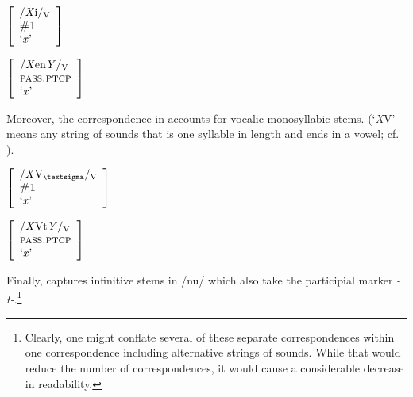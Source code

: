 \documentclass[output=paper,colorlinks,citecolor=brown,
]{langscibook}
\begin{document}
\begin{minipage}[t]{0.33\textwidth}
\ea\label{ex:rulePASS_i}
$\left[
\begin{array}{l}
    \text{/\textit{X}i/\textsubscript{V}} \\
    \textsc{\#1} \\
    \text{`\textit{x}'}
\end{array}
\right] $ 
\z
\end{minipage}%
\begin{minipage}[t]{0.45\textwidth}
\begin{exe}
\exi{$\longleftrightarrow$}
$\left[
\begin{array}{l}
    \text{/\textit{X}en\textit{Y}/\textsubscript{V}} \\
    \textsc{pass.ptcp} \\
    \text{`\textit{x}'}
\end{array}
\right] $
\end{exe}
\end{minipage}

\bigskip

\noindent Moreover, the correspondence in  accounts for vocalic monosyllabic stems. (`\textit{X}V\textsubscript{\textsigma}' means any string of sounds that is one syllable in length and ends in a vowel; cf. \citealt[58]{HaspelmathSims2010}).

\begin{minipage}[t]{0.27\textwidth}
\ea\label{ex:rulePASS_t_1}
$\left[
\begin{array}{l}
    \text{/\textit{X}V\textsubscript{\textsigma}/\textsubscript{V}} \\
    \textsc{\#1} \\
    \text{`\textit{x}'}
\end{array}
\right] $ 
\z
\end{minipage}%
\begin{minipage}[t]{0.45\textwidth}
\begin{exe}
\exi{$\longleftrightarrow$}
$\left[
\begin{array}{l}
    \text{/\textit{X}Vt\textit{Y}/\textsubscript{V}} \\
    \textsc{pass.ptcp} \\
    \text{`\textit{x}'}
\end{array}
\right] $
\end{exe}
\end{minipage}

\bigskip

\noindent Finally,  captures infinitive stems in /nu/ which also take the participial marker \textit{-t-}.\footnote{Clearly, one might conflate several of these separate correspondences within one correspondence including alternative strings of sounds. While that would reduce the number of correspondences, it would cause a considerable decrease in readability.}
\end{document}
